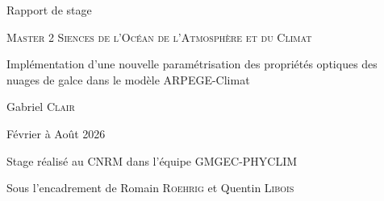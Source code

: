 \begin{titlepage}
    \begin{center}
        \vspace{2 cm}
        \Huge {Rapport de stage}
        \vfill

        \huge\textsc{Master 2 Siences de l'Océan de l'Atmosphère et du Climat}

        \vfill
        \huge {Implémentation d'une nouvelle paramétrisation des propriétés optiques des nuages de galce dans le modèle ARPEGE-Climat}
        \vfill

        
        \Large Gabriel \textsc{Clair}

        \Large Février à Août 2026

        \vfill
        Stage réalisé au CNRM dans l'équipe GMGEC-PHYCLIM 
        
        Sous l'encadrement de Romain \textsc{Roehrig} et Quentin \textsc{Libois}
    \end{center}
    
\end{titlepage}


